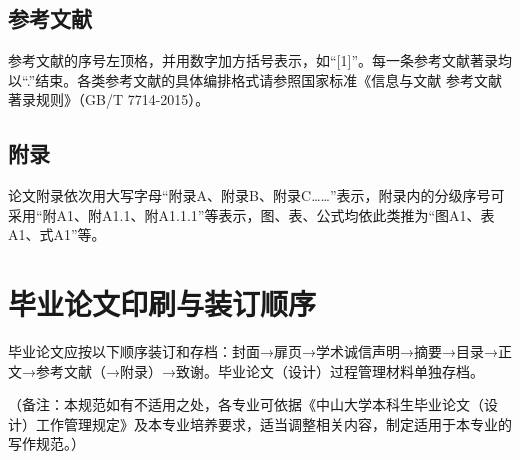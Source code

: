 \subsection{参考文献}

参考文献的序号左顶格，并用数字加方括号表示，如“[1]”。每一条参考文献著录均以“.”结束。各类参考文献的具体编排格式请参照国家标准《信息与文献 参考文献著录规则》（GB/T 7714-2015）。

\subsection{附录}

论文附录依次用大写字母“附录A、附录B、附录C……”表示，附录内的分级序号可采用“附A1、附A1.1、附A1.1.1”等表示，图、表、公式均依此类推为“图A1、表A1、式A1”等。

\section{毕业论文印刷与装订顺序}

毕业论文应按以下顺序装订和存档：封面→扉页→学术诚信声明→摘要→目录→正文→参考文献（→附录）→致谢。毕业论文（设计）过程管理材料单独存档。

（备注：本规范如有不适用之处，各专业可依据《中山大学本科生毕业论文（设计）工作管理规定》及本专业培养要求，适当调整相关内容，制定适用于本专业的写作规范。）
